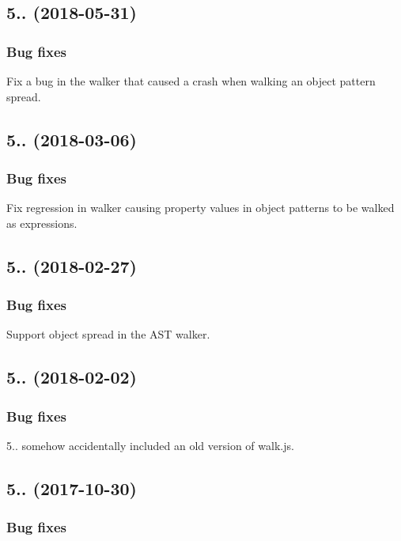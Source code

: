 \subsection*{5.. (2018-\/05-\/31)}

\subsubsection*{Bug fixes}

Fix a bug in the walker that caused a crash when walking an object pattern spread.

\subsection*{5.. (2018-\/03-\/06)}

\subsubsection*{Bug fixes}

Fix regression in walker causing property values in object patterns to be walked as expressions.

\subsection*{5.. (2018-\/02-\/27)}

\subsubsection*{Bug fixes}

Support object spread in the A\+ST walker.

\subsection*{5.. (2018-\/02-\/02)}

\subsubsection*{Bug fixes}

5.. somehow accidentally included an old version of walk.\+js.

\subsection*{5.. (2017-\/10-\/30)}

\subsubsection*{Bug fixes}

